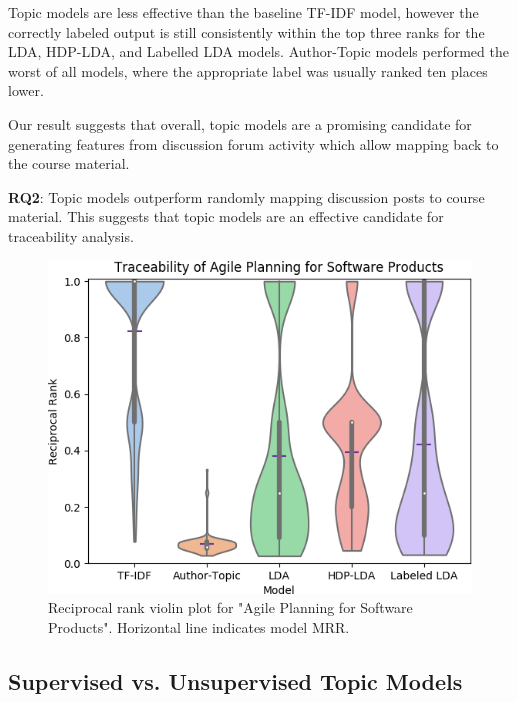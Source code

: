 \documentclass[sigconf, anonymous]{acmart}
\begin{document}
Topic models are less effective than the baseline TF-IDF model, however the correctly labeled output is still consistently within the top three ranks for the LDA, HDP-LDA, and Labelled LDA models. Author-Topic models performed the worst of all models, where the appropriate label was usually ranked ten places lower. %

Our result suggests that overall, topic models are a promising candidate for generating features from discussion forum activity which allow mapping back to the course material. %


\begin{tcolorbox}[sharp corners, top=1mm, bottom=1mm]
\textbf{RQ2}: Topic models outperform randomly mapping discussion posts to course material. This suggests that topic models are an effective candidate for traceability analysis.
\end{tcolorbox}

\begin{figure}
    \centering
    \includegraphics[width=\columnwidth]{fig/agile-planning-bootstrap.png}
    \caption{Reciprocal rank violin plot for "Agile Planning for Software Products". Horizontal line indicates model MRR.}
    \label{fig:agile-planning-plot}
\end{figure}

\subsection{Supervised vs. Unsupervised Topic Models}
\end{document}
